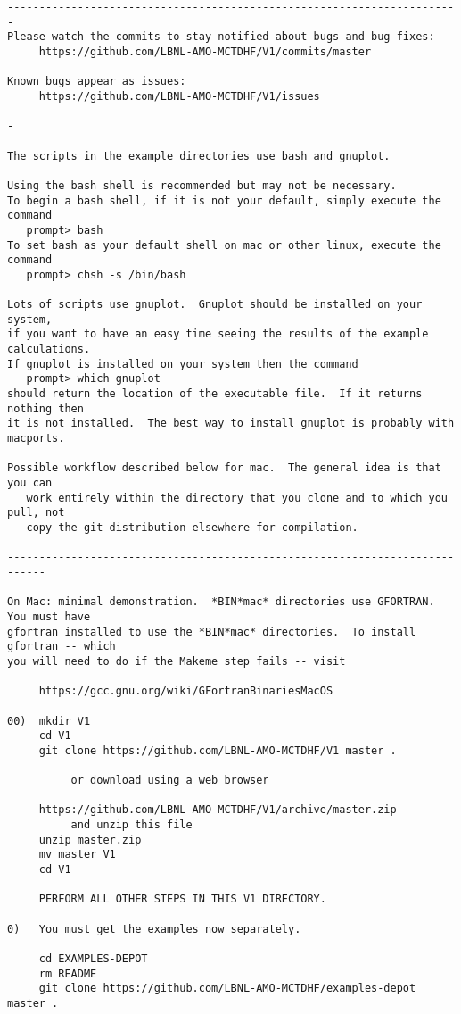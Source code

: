 \begin{verbatim}
-----------------------------------------------------------------------
Please watch the commits to stay notified about bugs and bug fixes:
     https://github.com/LBNL-AMO-MCTDHF/V1/commits/master

Known bugs appear as issues:
     https://github.com/LBNL-AMO-MCTDHF/V1/issues
-----------------------------------------------------------------------

The scripts in the example directories use bash and gnuplot.  

Using the bash shell is recommended but may not be necessary.
To begin a bash shell, if it is not your default, simply execute the command
   prompt> bash
To set bash as your default shell on mac or other linux, execute the command
   prompt> chsh -s /bin/bash

Lots of scripts use gnuplot.  Gnuplot should be installed on your system,
if you want to have an easy time seeing the results of the example calculations.
If gnuplot is installed on your system then the command
   prompt> which gnuplot
should return the location of the executable file.  If it returns nothing then
it is not installed.  The best way to install gnuplot is probably with macports.

Possible workflow described below for mac.  The general idea is that you can 
   work entirely within the directory that you clone and to which you pull, not 
   copy the git distribution elsewhere for compilation.

----------------------------------------------------------------------------

On Mac: minimal demonstration.  *BIN*mac* directories use GFORTRAN.  You must have
gfortran installed to use the *BIN*mac* directories.  To install gfortran -- which
you will need to do if the Makeme step fails -- visit 

     https://gcc.gnu.org/wiki/GFortranBinariesMacOS

00)  mkdir V1
     cd V1
     git clone https://github.com/LBNL-AMO-MCTDHF/V1 master .

          or download using a web browser

     https://github.com/LBNL-AMO-MCTDHF/V1/archive/master.zip
          and unzip this file
     unzip master.zip
     mv master V1
     cd V1

     PERFORM ALL OTHER STEPS IN THIS V1 DIRECTORY.

0)   You must get the examples now separately.

     cd EXAMPLES-DEPOT
     rm README
     git clone https://github.com/LBNL-AMO-MCTDHF/examples-depot master .


\end{verbatim}
